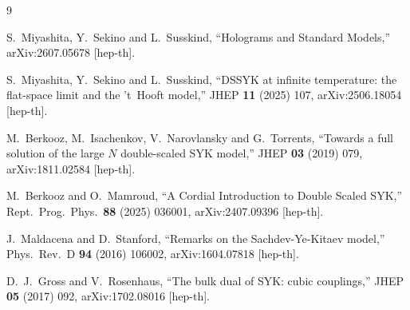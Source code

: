 \documentclass[11pt]{article}
\begin{document}
\begin{thebibliography}{9}

S.~Miyashita, Y.~Sekino and L.~Susskind,
``Holograms and Standard Models,''
arXiv:2607.05678 [hep-th].

S.~Miyashita, Y.~Sekino and L.~Susskind,
``DSSYK at infinite temperature: the flat-space limit and the 't~Hooft model,''
JHEP \textbf{11} (2025) 107, arXiv:2506.18054 [hep-th].

M.~Berkooz, M.~Isachenkov, V.~Narovlansky and G.~Torrents,
``Towards a full solution of the large $N$ double-scaled SYK model,''
JHEP \textbf{03} (2019) 079, arXiv:1811.02584 [hep-th].

M.~Berkooz and O.~Mamroud,
``A Cordial Introduction to Double Scaled SYK,''
Rept.\ Prog.\ Phys.\ \textbf{88} (2025) 036001, arXiv:2407.09396 [hep-th].

J.~Maldacena and D.~Stanford,
``Remarks on the Sachdev-Ye-Kitaev model,''
Phys.\ Rev.\ D \textbf{94} (2016) 106002, arXiv:1604.07818 [hep-th].

D.~J.~Gross and V.~Rosenhaus,
``The bulk dual of SYK: cubic couplings,''
JHEP \textbf{05} (2017) 092, arXiv:1702.08016 [hep-th].

\end{thebibliography}
\end{document}
